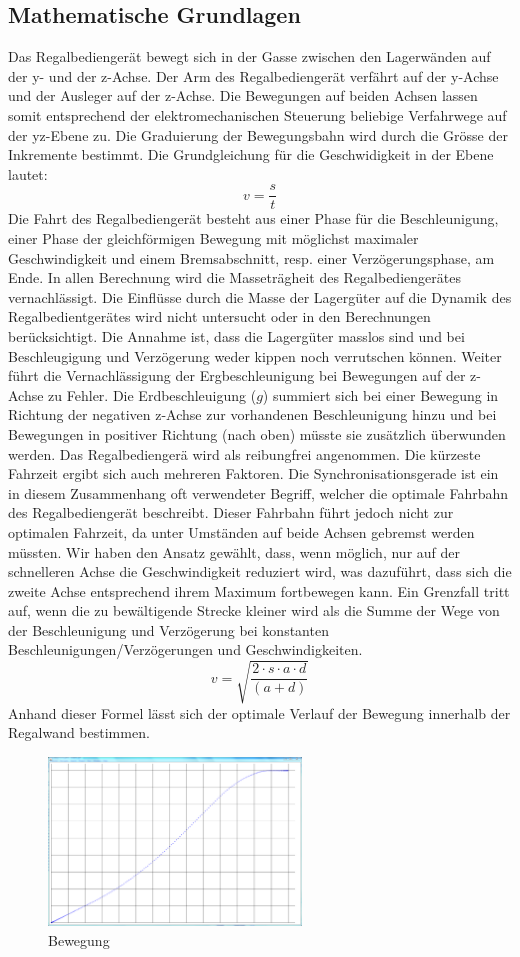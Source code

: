 \subsection{Mathematische Grundlagen}
Das Regalbediengerät bewegt sich in der Gasse zwischen den Lagerwänden auf der y- und der z-Achse. Der Arm des Regalbediengerät verfährt auf der y-Achse und der Ausleger auf der z-Achse. Die Bewegungen auf beiden Achsen lassen somit entsprechend der elektromechanischen Steuerung beliebige Verfahrwege auf der yz-Ebene zu. Die Graduierung der Bewegungsbahn wird durch die Grösse der Inkremente bestimmt.
%
Die Grundgleichung für die Geschwidigkeit in der Ebene lautet:
%
\begin{equation}
v = \frac{s}{t}
\end{equation}
%
Die Fahrt des Regalbediengerät besteht aus einer Phase für die Beschleunigung, einer Phase der gleichförmigen Bewegung mit möglichst maximaler Geschwindigkeit und einem Bremsabschnitt, resp. einer Verzögerungsphase, am Ende. In allen Berechnung wird die Masseträgheit des Regalbediengerätes vernachlässigt. Die Einflüsse durch die Masse der Lagergüter auf die Dynamik des Regalbedientgerätes wird nicht untersucht oder in den Berechnungen berücksichtigt. Die Annahme ist, dass die Lagergüter masslos sind und bei Beschleugigung und Verzögerung weder kippen noch verrutschen können. Weiter führt die Vernachlässigung der Ergbeschleunigung bei Bewegungen auf der z-Achse zu Fehler. Die Erdbeschleuigung ($ g $) summiert sich bei einer Bewegung in Richtung der negativen z-Achse zur vorhandenen Beschleunigung hinzu und bei Bewegungen in positiver Richtung (nach oben) müsste sie zusätzlich überwunden werden. Das Regalbediengerä wird als reibungfrei angenommen.
%
Die kürzeste Fahrzeit ergibt sich auch mehreren Faktoren. Die Synchronisationsgerade ist ein in diesem Zusammenhang oft verwendeter Begriff, welcher die optimale Fahrbahn des Regalbediengerät beschreibt. Dieser Fahrbahn führt jedoch nicht zur optimalen Fahrzeit, da unter Umständen auf beide Achsen gebremst werden müssten. Wir haben den Ansatz gewählt, dass, wenn möglich, nur auf der schnelleren Achse die Geschwindigkeit reduziert wird, was dazuführt, dass sich die zweite Achse entsprechend ihrem Maximum fortbewegen kann.
%
Ein Grenzfall tritt auf, wenn die zu bewältigende Strecke kleiner wird als die Summe der Wege von der Beschleunigung und Verzögerung bei konstanten Beschleunigungen/Verzögerungen und Geschwindigkeiten. 
%
\begin{equation}
v = \sqrt{\frac{2 \cdot s \cdot a \cdot d}{(a+d)}}
\end{equation}
%
Anhand dieser Formel lässt sich der optimale Verlauf der Bewegung innerhalb der Regalwand bestimmen.
%
\begin{figure}[H]
  \begin{center}
    \includegraphics[width=0.6\textwidth]{images/motion.png}
    \caption{Bewegung}
    \label{fig:beweg}
  \end{center}
\end{figure}
%
